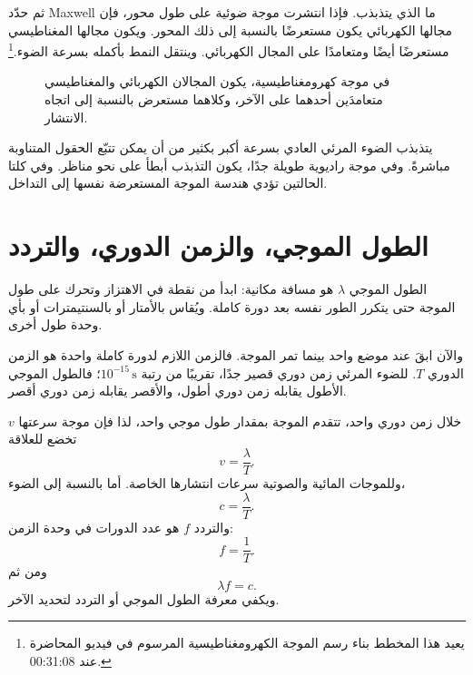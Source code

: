 ثم حدّد Maxwell ما الذي يتذبذب. فإذا انتشرت موجة ضوئية على طول محور، فإن مجالها الكهربائي يكون مستعرضًا بالنسبة إلى ذلك المحور. ويكون مجالها المغناطيسي مستعرضًا أيضًا ومتعامدًا على المجال الكهربائي. وينتقل النمط بأكمله بسرعة الضوء.\footnote{يعيد هذا المخطط بناء رسم الموجة الكهرومغناطيسية المرسوم في فيديو المحاضرة عند 00:31:08.}

\begin{figure}[h]
\centering
{}
\caption{في موجة كهرومغناطيسية، يكون المجالان الكهربائي والمغناطيسي متعامدَين أحدهما على الآخر، وكلاهما مستعرض بالنسبة إلى اتجاه الانتشار.}
\end{figure}

يتذبذب الضوء المرئي العادي بسرعة أكبر بكثير من أن يمكن تتبّع الحقول المتناوبة مباشرةً. وفي موجة راديوية طويلة جدًا، يكون التذبذب أبطأ على نحو مناظر. وفي كلتا الحالتين تؤدي هندسة الموجة المستعرضة نفسها إلى التداخل.

\section{الطول الموجي، والزمن الدوري، والتردد}

الطول الموجي \(\lambda\) هو مسافة مكانية: ابدأ من نقطة في الاهتزاز وتحرك على طول الموجة حتى يتكرر الطور نفسه بعد دورة كاملة. ويُقاس بالأمتار أو بالسنتيمترات أو بأي وحدة طول أخرى.

والآن ابقَ عند موضع واحد بينما تمر الموجة. فالزمن اللازم لدورة كاملة واحدة هو الزمن الدوري \(T\). للضوء المرئي زمن دوري قصير جدًا، تقريبًا من رتبة \(10^{-15}\,\mathrm{s}\)؛ فالطول الموجي الأطول يقابله زمن دوري أطول، والأقصر يقابله زمن دوري أقصر.

خلال زمن دوري واحد، تتقدم الموجة بمقدار طول موجي واحد، لذا فإن موجة سرعتها \(v\) تخضع للعلاقة
\begin{equation}
v=\frac{\lambda}{T}.
\end{equation}
وللموجات المائية والصوتية سرعات انتشارها الخاصة. أما بالنسبة إلى الضوء،
\begin{equation}
c=\frac{\lambda}{T}.
\end{equation}
والتردد \(f\) هو عدد الدورات في وحدة الزمن:
\begin{equation}
f=\frac{1}{T}.
\end{equation}
ومن ثم
\begin{equation}
\lambda f=c.
\end{equation}
ويكفي معرفة الطول الموجي أو التردد لتحديد الآخر.

